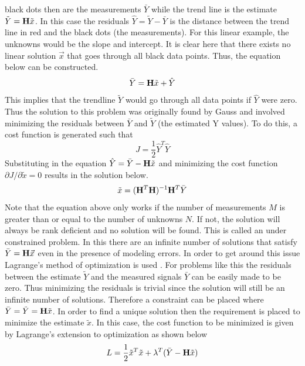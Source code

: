 black dots then are the measurements $\bar{Y}$ while the trend line is
the estimate $\tilde{Y} = {\bf H}\tilde{x}$. In this case the residuals
$\hat{Y} = \tilde{Y}-\bar{Y}$ is the distance between the trend line
in red and the black dots (the measurements). For this linear example,
the unknowns would be the slope and intercept. It is clear here that
there exists no linear solution $\vec{x}$ that goes through all black
data points. Thus, the equation below can be constructed.
\begin{equation}
  \bar{Y} = {\bf H}\tilde{x} + \hat{Y}
\end{equation}
This implies that the trendline $\tilde{Y}$ would go through all data
points if $\hat{Y}$ were zero. Thus the solution to this problem was
originally found by Gauss \cite{stigler1981} and involved minimizing
the residuals between $\bar{Y}$ and $\tilde{Y}$ (the estimated Y
values). To do this, a cost function is generated such that
\begin{equation}
  J = \frac{1}{2}\hat{Y}^T \hat{Y}
\end{equation}
Substituting in the equation $\hat{Y} = \bar{Y} - {\bf H}\tilde{x}$
and minimizing the cost function $\partial J/\partial \tilde{x} = 0$
results in the solution below.
\begin{equation}
  \tilde{x} = ({\bf H}^T{\bf H})^{-1}{\bf H}^T\bar{Y}
\end{equation}
Note that the equation above only works if the number of measurements $M$
is greater than or equal to the number of unknowns $N$. If not, the
solution will always be rank deficient and no solution will be
found. This is called an under constrained problem. In this there are
an infinite number of solutions that satisfy $\bar{Y} = {\bf
  H}\vec{x}$ even in the presence of modeling errors. In order
to get around this issue Lagrange's method of 
optimization is used \cite{lagrange}. For problems like this the
residuals between the estimate $\tilde{Y}$ and the measured signals
$\bar{Y}$ can be easily made to be zero. Thus minimizing the residuals
is trivial since the solution will still be an infinite number of
solutions. Therefore a constraint can be placed where
$\bar{Y}=\tilde{Y}={\bf H}\tilde{x}$. In order to find a unique
solution then the requirement is placed to minimize the estimate
$\tilde{x}$. In this case, the cost function
to be minimized is given by Lagrange's extension to optimization as
shown below
\begin{equation}
L = \frac{1}{2}\tilde{x}^T\tilde{x} + \lambda^T(\bar{Y}-{\bf H}\tilde{x})
\end{equation}
